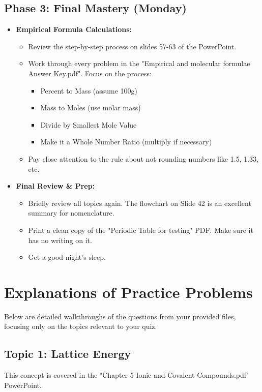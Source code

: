 \documentclass{article}
\begin{document}
\subsection*{Phase 3: Final Mastery (Monday)}
\begin{itemize}[itemsep=5pt]
    \item \textbf{Empirical Formula Calculations:}
    \begin{itemize}
        \item Review the step-by-step process on slides 57-63 of the PowerPoint.
        \item Work through every problem in the "Empirical and molecular formulae Answer Key.pdf". Focus on the process:
        \begin{itemize}
            \item Percent to Mass (assume 100g)
            \item Mass to Moles (use molar mass)
            \item Divide by Smallest Mole Value
            \item Make it a Whole Number Ratio (multiply if necessary)
        \end{itemize}
        \item Pay close attention to the rule about not rounding numbers like 1.5, 1.33, etc.
    \end{itemize}
    \item \textbf{Final Review \& Prep:}
    \begin{itemize}
        \item Briefly review all topics again. The flowchart on Slide 42 is an excellent summary for nomenclature.
        \item Print a clean copy of the "Periodic Table for testing" PDF. Make sure it has no writing on it.
        \item Get a good night's sleep.
    \end{itemize}
\end{itemize}

\bigskip
\section*{Explanations of Practice Problems}
Below are detailed walkthroughs of the questions from your provided files, focusing only on the topics relevant to your quiz.

\subsection*{Topic 1: Lattice Energy}
This concept is covered in the "Chapter 5 Ionic and Covalent Compounds.pdf" PowerPoint.
\end{document}
